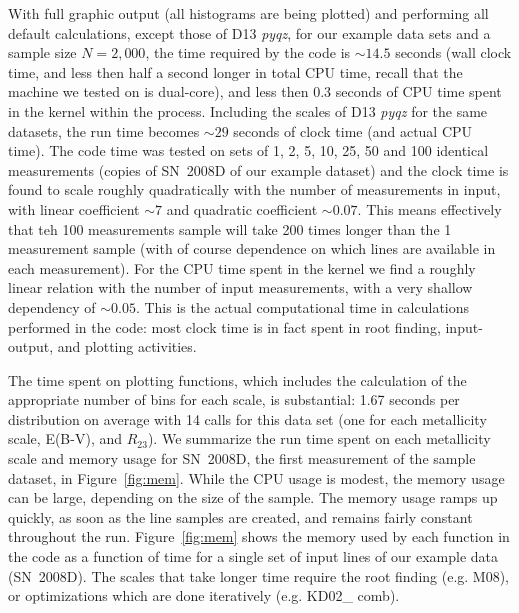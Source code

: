 \documentclass{emulateapj}
\begin{document}
With full graphic output (all histograms are being plotted) and performing all default calculations, except those of D13 \emph{pyqz}, for our example data sets and a sample size $N=2,000$, the time required by the code is $\sim14.5$ seconds (wall clock time, and less then half a second longer in total CPU time, recall that the machine we tested on is dual-core), and less then 0.3 seconds of CPU time spent in the kernel within the process. Including  the scales of D13 \emph{pyqz} for the same datasets, the run time becomes $\sim29$ seconds of clock time (and actual CPU time). 
The code time was tested on sets of 1, 2, 5, 10, 25, 50 and 100 identical measurements (copies of SN~2008D of our example dataset) and the clock time is found to scale roughly quadratically with the number of measurements in input, with linear coefficient $\sim7$ and quadratic coefficient $\sim0.07$. This means effectively that teh 100 measurements sample will take 200 times longer than the 1 measurement sample (with of course dependence on which lines are available in each measurement). For the CPU time spent in the kernel we find a roughly linear relation with the number of input measurements, with a very shallow dependency of $\sim 0.05$. This is the actual computational time in calculations performed in the code: most clock time is in fact spent in root finding, input-output, and plotting activities.


The time spent on plotting functions, which includes the calculation of the appropriate number of bins for each scale, is substantial: 1.67 seconds per distribution on average with 14 calls for this data set (one for each metallicity scale, E(B-V), and $R_{23}$). 
We summarize the run time spent on each metallicity scale and memory usage for SN~2008D, the first measurement of the sample dataset, in Figure~\ref{fig:mem}. While the CPU usage is modest, the memory usage can be large, depending on the size of the sample.  The memory usage ramps up quickly, as soon as the line samples are created, 
and remains fairly constant throughout the run.  Figure~\ref{fig:mem} shows the memory used by each function in the code as a function of time for a single set of input lines of our example data (SN~2008D). The scales that take longer time require the root finding (e.g. M08), or optimizations which are done iteratively (e.g. KD02\_ comb).
\end{document}
